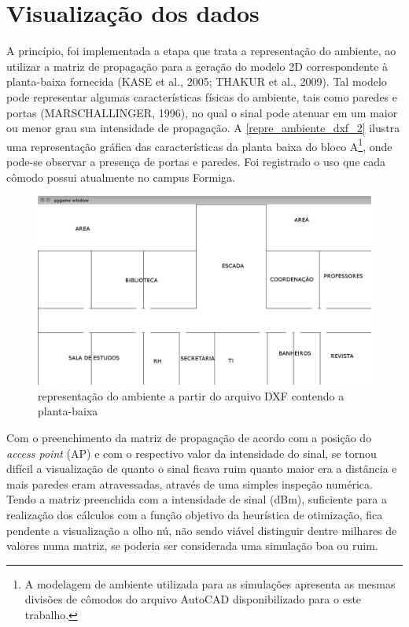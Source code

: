 \documentclass[
	12pt,				%
	openright,			%
	twoside,			%
	a4paper,			%
	english,			%
	french,				%
	spanish,			%
	brazil				%
	]{abntex2}
\begin{document}
\section[Visualização dos dados]{Visualização dos dados}

A princípio, foi implementada a etapa que trata a representação do ambiente, ao utilizar a matriz de propagação para a geração do modelo 2D correspondente à planta-baixa fornecida (KASE et al., 2005; THAKUR et al., 2009). Tal modelo pode representar algumas características físicas do ambiente, tais como paredes e portas (MARSCHALLINGER, 1996), no qual o sinal pode atenuar em um maior ou menor grau sua intensidade de propagação. A \autoref{repre_ambiente_dxf_2} ilustra uma representação gráfica das características da planta baixa do bloco A\footnote{A modelagem de ambiente utilizada para as simulações apresenta as mesmas divisões de cômodos do arquivo AutoCAD disponibilizado para o este trabalho.}, onde pode-se observar a presença de portas e paredes. Foi registrado o uso que cada cômodo possui atualmente no campus Formiga.

\begin{figure}[ht]
	\caption{\label{repre_ambiente_dxf_2}representação do ambiente a partir do arquivo DXF contendo a planta-baixa}
	\begin{center}
		\includegraphics[scale=0.4]{images/planta-labels.jpg}
	\end{center}
\end{figure}

Com o preenchimento da matriz de propagação de acordo com a posição do \textit{access point} (AP) e com o respectivo valor da intensidade do sinal, se tornou difícil a visualização de quanto o sinal ficava ruim quanto maior era a distância e mais paredes eram atravessadas, através de uma simples inspeção numérica. Tendo a matriz preenchida com a intensidade de sinal (dBm), suficiente para a realização dos cálculos com a função objetivo da heurística de otimização, fica pendente a visualização a olho nú, não sendo viável distinguir dentre milhares de valores numa matriz, se poderia ser considerada uma simulação boa ou ruim. 
\end{document}
